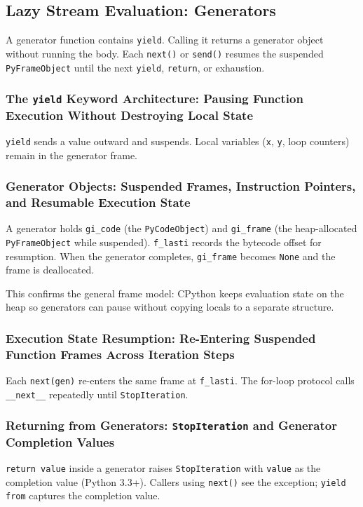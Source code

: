 \subsection{Lazy Stream Evaluation: Generators}

A generator function contains \texttt{yield}. Calling it returns a generator object without running the body. Each \texttt{next()} or \texttt{send()} resumes the suspended \texttt{PyFrameObject} until the next \texttt{yield}, \texttt{return}, or exhaustion.

\subsubsection{The \texttt{yield} Keyword Architecture: Pausing Function Execution Without Destroying Local State}



\texttt{yield} sends a value outward and suspends. Local variables (\texttt{x}, \texttt{y}, loop counters) remain in the generator frame.

\subsubsection{Generator Objects: Suspended Frames, Instruction Pointers, and Resumable Execution State}

A generator holds \texttt{gi\_code} (the \texttt{PyCodeObject}) and \texttt{gi\_frame} (the heap-allocated \texttt{PyFrameObject} while suspended). \texttt{f\_lasti} records the bytecode offset for resumption. When the generator completes, \texttt{gi\_frame} becomes \texttt{None} and the frame is deallocated.



This confirms the general frame model: CPython keeps evaluation state on the heap so generators can pause without copying locals to a separate structure.

\subsubsection{Execution State Resumption: Re-Entering Suspended Function Frames Across Iteration Steps}

Each \texttt{next(gen)} re-enters the same frame at \texttt{f\_lasti}. The for-loop protocol calls \texttt{\_\_next\_\_} repeatedly until \texttt{StopIteration}.

\subsubsection{Returning from Generators: \texttt{StopIteration} and Generator Completion Values}

\texttt{return value} inside a generator raises \texttt{StopIteration} with \texttt{value} as the completion value (Python 3.3+). Callers using \texttt{next()} see the exception; \texttt{yield from} captures the completion value.
